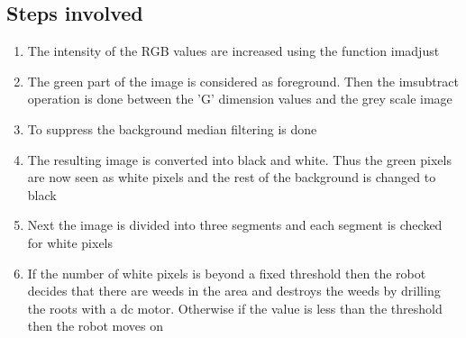 \documentclass{report}
\begin{document}
\subsection*{Steps involved}
\begin{enumerate}
\item The intensity of the RGB values are increased using the function imadjust
\item	The green part of the image is considered as foreground. Then the imsubtract operation is done between the 'G' dimension values and the grey scale image
\item	To suppress the background median filtering is done
\item	The resulting image is converted into black and white. Thus the green pixels are now seen as white pixels and the rest of the background is changed to black
\item	Next the image is divided into three segments and each segment is checked for white pixels
\item	If the number of white pixels is beyond a fixed threshold then the robot decides that there are weeds in the area and destroys the weeds by drilling the roots with a dc motor. Otherwise if the value is less than the threshold then the robot moves on
\end{enumerate}
\end{document}
